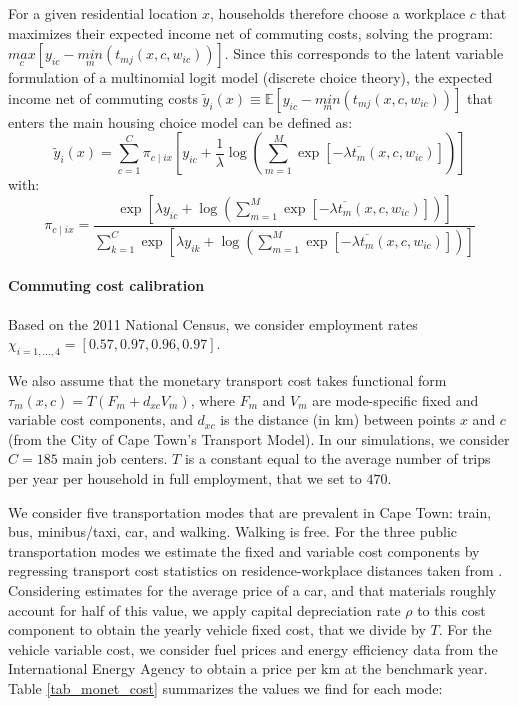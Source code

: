 \documentclass[12pt]{article}
\begin{document}
For a given residential location $x$, households therefore choose a workplace $c$ that maximizes their expected income net of commuting costs, solving the program: $\underset{c}{max} \left[y_{ic} - \underset{m}{min} \left(t_{mj}(x,c,w_{ic})\right)\right]$. Since this corresponds to the latent variable formulation of a multinomial logit model (discrete choice theory), the expected income net of commuting costs $\tilde{y}_i(x) \equiv \mathbb{E}\left[ y_{ic} - \underset{m}{min} \left(t_{mj}(x,c,w_{ic})\right) \right]$ that enters the main housing choice model can be defined as:
\begin{equation*}
    \tilde{y}_{i}(x)={ \sum_{c=1}^{C}} \pi_{c\mid ix}\left[y_{ic}+\frac{1}{\lambda}\log\left({ \sum_{m=1}^{M}}\exp\left[-\lambda \overline{t_{m}}(x,c,w_{ic}) \right]\right)\right]
\end{equation*}
with:
\begin{equation*}
    \pi_{c\mid ix}=\frac{\exp\left[\lambda y_{ic}+\log\left({ \sum\limits_{m=1}^{M}}\exp\left[-\lambda\overline{t_{m}}(x,c,w_{ic})\right]\right)\right]}{{ \sum_{k=1}^{C}}\exp\left[\lambda y_{ik}+\log\left({ \sum\limits_{m=1}^{M}}\exp\left[-\lambda\overline{t_{m}}(x,c,w_{ic})\right]\right)\right]}
\end{equation*}

\paragraph{Commuting cost calibration}

Based on the 2011 National Census, we consider employment rates $\chi_{i=1,...,4}=[0.57,0.97,0.96,0.97]$.

We also assume that the monetary transport cost takes functional form $\tau_m(x,c) = T(F_m + d_{xc}V_m)$, where $F_m$ and $V_m$ are mode-specific fixed and variable cost components, and $d_{xc}$ is the distance (in km) between points $x$ and $c$ (from the City of Cape Town's Transport Model). In our simulations, we consider $C=185$ main job centers. $T$ is a constant equal to the average number of trips per year per household in full employment, that we set to $470$.

We consider five transportation modes that are prevalent in Cape Town: train, bus, minibus/taxi, car, and walking. Walking is free. For the three public transportation modes we estimate the fixed and variable cost components by regressing transport cost statistics on residence-workplace distances taken from \citet{Roux2013ACountries}. Considering estimates for the average price of a car, and that materials roughly account for half of this value, we apply capital depreciation rate $\rho$ to this cost component to obtain the yearly vehicle fixed cost, that we divide by $T$. For the vehicle variable cost, we consider fuel prices and energy efficiency data from the International Energy Agency to obtain a price per km at the benchmark year. Table \ref{tab_monet_cost} summarizes the values we find for each mode:
\end{document}
